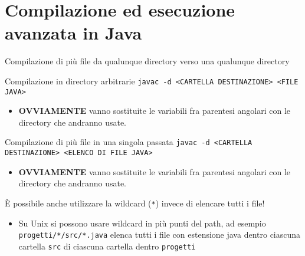 \documentclass[xcolor=dvipsnames,presentation]{beamer}
\begin{document}
\section{Compilazione ed esecuzione avanzata in Java}


\begin{frame}{Compilazione di più file da qualunque directory verso una qualunque directory}
  \begin{block}{Compilazione in directory arbitrarie}
    \texttt{javac -d <CARTELLA DESTINAZIONE> <FILE JAVA>}
    \begin{itemize}
      \item \textbf{OVVIAMENTE} vanno sostituite le variabili fra parentesi angolari con le
directory che andranno usate.
    \end{itemize}
  \end{block}
  \begin{block}{Compilazione di più file in una singola passata}
    \texttt{javac -d <CARTELLA DESTINAZIONE> <ELENCO DI FILE JAVA>}
    \begin{itemize}
      \item \textbf{OVVIAMENTE} vanno sostituite le variabili fra parentesi angolari con le
directory che andranno usate.
    \end{itemize}
  \end{block}
  È possibile anche utilizzare la wildcard (\texttt{*}) invece di elencare tutti i file!
  \begin{itemize}
    \item Su Unix si possono usare wildcard in più punti del path, ad esempio
\texttt{progetti/*/src/*.java} elenca tutti i file con estensione java dentro ciascuna cartella
\texttt{src} di ciascuna cartella dentro \texttt{progetti}
  \end{itemize}
\end{frame}
\end{document}
